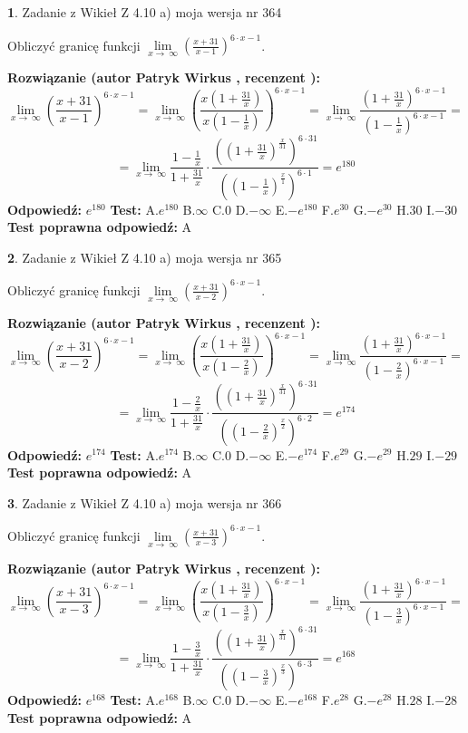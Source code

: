 \documentclass[12pt, a4paper]{article}
\theoremstyle{definition} %
\newtheorem{zad}{}
\newcommand{\zadStart}[1]{\begin{zad}#1\newline}
\newcommand{\zadStop}{\end{zad}}
\newcommand{\rozwStart}[2]{\noindent \textbf{Rozwiązanie (autor #1 , recenzent #2): }\newline}
\newcommand{\rozwStop}{\newline}
\newcommand{\odpStart}{\noindent \textbf{Odpowiedź:}\newline}
\newcommand{\odpStop}{\newline}
\newcommand{\testStart}{\noindent \textbf{Test:}\newline}
\newcommand{\testStop}{\newline}
\newcommand{\kluczStart}{\noindent \textbf{Test poprawna odpowiedź:}\newline}
\newcommand{\kluczStop}{\newline}
\begin{document}
\zadStart{Zadanie z Wikieł Z 4.10 a) moja wersja nr 364}

Obliczyć granicę funkcji  $\lim\limits_{x\to\ \infty}(\frac{x+31}{x-1})^{6\cdot x-1}$.
\zadStop
\rozwStart{Patryk Wirkus}{}
$$\lim\limits_{x\to\ \infty}(\frac{x+31}{x-1})^{6\cdot x-1} = \lim\limits_{x\to\ \infty}(\frac{x(1+\frac{31}{x})}{x(1-\frac{1}{x})})^{6\cdot x-1}=\lim\limits_{x\to\ \infty}\frac{(1+\frac{31}{x})^{6\cdot x-1}}{(1-\frac{1}{x})^{6\cdot x-1}}=$$
$$=\lim\limits_{x\to\ \infty}\frac{1-\frac{1}{x}}{1+\frac{31}{x}}\cdot\frac{((1+\frac{31}{x})^{\frac{x}{31}})^{6\cdot31}}{((1-\frac{1}{x})^{\frac{x}{1}})^{6\cdot1}}=e^{180}$$
\rozwStop
\odpStart
$e^{180}$
\odpStop
\testStart
A.$e^{180}$ B.$\infty$ C.$0$ D.$-\infty$ E.$-e^{180}$
F.$e^{30}$ G.$-e^{30}$
H.$30$
I.$-30$
\testStop
\kluczStart
A
\kluczStop



\zadStart{Zadanie z Wikieł Z 4.10 a) moja wersja nr 365}

Obliczyć granicę funkcji  $\lim\limits_{x\to\ \infty}(\frac{x+31}{x-2})^{6\cdot x-1}$.
\zadStop
\rozwStart{Patryk Wirkus}{}
$$\lim\limits_{x\to\ \infty}(\frac{x+31}{x-2})^{6\cdot x-1} = \lim\limits_{x\to\ \infty}(\frac{x(1+\frac{31}{x})}{x(1-\frac{2}{x})})^{6\cdot x-1}=\lim\limits_{x\to\ \infty}\frac{(1+\frac{31}{x})^{6\cdot x-1}}{(1-\frac{2}{x})^{6\cdot x-1}}=$$
$$=\lim\limits_{x\to\ \infty}\frac{1-\frac{2}{x}}{1+\frac{31}{x}}\cdot\frac{((1+\frac{31}{x})^{\frac{x}{31}})^{6\cdot31}}{((1-\frac{2}{x})^{\frac{x}{2}})^{6\cdot2}}=e^{174}$$
\rozwStop
\odpStart
$e^{174}$
\odpStop
\testStart
A.$e^{174}$ B.$\infty$ C.$0$ D.$-\infty$ E.$-e^{174}$
F.$e^{29}$ G.$-e^{29}$
H.$29$
I.$-29$
\testStop
\kluczStart
A
\kluczStop



\zadStart{Zadanie z Wikieł Z 4.10 a) moja wersja nr 366}

Obliczyć granicę funkcji  $\lim\limits_{x\to\ \infty}(\frac{x+31}{x-3})^{6\cdot x-1}$.
\zadStop
\rozwStart{Patryk Wirkus}{}
$$\lim\limits_{x\to\ \infty}(\frac{x+31}{x-3})^{6\cdot x-1} = \lim\limits_{x\to\ \infty}(\frac{x(1+\frac{31}{x})}{x(1-\frac{3}{x})})^{6\cdot x-1}=\lim\limits_{x\to\ \infty}\frac{(1+\frac{31}{x})^{6\cdot x-1}}{(1-\frac{3}{x})^{6\cdot x-1}}=$$
$$=\lim\limits_{x\to\ \infty}\frac{1-\frac{3}{x}}{1+\frac{31}{x}}\cdot\frac{((1+\frac{31}{x})^{\frac{x}{31}})^{6\cdot31}}{((1-\frac{3}{x})^{\frac{x}{3}})^{6\cdot3}}=e^{168}$$
\rozwStop
\odpStart
$e^{168}$
\odpStop
\testStart
A.$e^{168}$ B.$\infty$ C.$0$ D.$-\infty$ E.$-e^{168}$
F.$e^{28}$ G.$-e^{28}$
H.$28$
I.$-28$
\testStop
\kluczStart
A
\kluczStop
\end{document}

